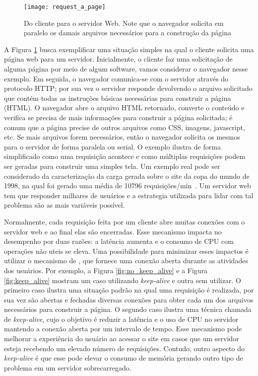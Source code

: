 \begin{figure}[!h]
  \centering
  \texttt{[image: request\_a\_page]}
  \caption{Do cliente para o servidor Web. Note que o navegador solicita em paralelo os damais arquivos necessários para a construção da página}
  \label{fig:client_to_web_server}
\end{figure}

A Figura \ref{fig:client_to_web_server} busca exemplificar uma situação simples
na qual o cliente solicita uma página web para um servidor. Inicialmente, o
cliente faz uma solicitação de alguma página por meio de algum software, vamos
considerar o navegador nesse exemplo. Em seguida, o navegador comunica-se com o
servidor através do protocolo HTTP; por sua vez o servidor responde devolvendo
o arquivo solicitado que contém todas as instruções básicas necessárias para
construir a página (HTML). O navegador abre o arquivo HTML retornado, converte
o conteúdo e verifica se precisa de mais informações para construir a página
solicitada; é comum que a página precise de outros arquivos como CSS, imagens,
javascript, etc. Se mais arquivos forem necessários, então o navegador solicita
os mesmos para o servidor de forma paralela ou serial. O exemplo ilustra de
forma simplificado como uma requisição acontece e como múltiplas requisições
podem ser geradas para construir uma simples tela. Um exemplo real pode ser
considerado da caracterização da carga gerada sobre o site da copa do mundo de
1998, na qual foi gerado uma média de 10796 requisições/min~\citep{worldcup}.
Um servidor web tem que responder milhares de usuários e a estrategia utilizada
para lidar com tal problema são as mais variáveis possível.

Normalmente, cada requisição feita por um cliente abre muitas conexões com o
servidor web e ao final elas são encerradas. Esse mecanismo impacta no
desempenho por duas razões: a latência aumenta e o consumo de CPU com operações
não uteis se eleva. Uma possibilidade para minimizar esses impactos é utilizar
o mecanismo de , que fornece uma conexão
aberta durante as atividades dos usuários. Por exemplo, a Figura
\ref{fig:no_keep_alive} e a Figura \ref{fig:keep_alive} mostram um caso
utilizando \textit{keep-alive} e outra sem utilizar. O primeiro caso ilustra
uma situação padrão na qual uma requisição é realizada, por sua vez são abertas
e fechadas diversas conexões para obter cada um dos arquivos necessários para
construir a página. O segundo caso ilustra uma técnica chamada de
\textit{keep-alive}, cujo o objetivo é reduzir a latência e o uso de CPU no
servidor mantendo a conexão aberta por um intervalo de tempo.  Esse mecanismo
pode melhorar a experiência do usuário ao acessar o site em casos que um
servidor esteja recebendo um elevado número de requisições. Contudo, outro
aspecto do \textit{keep-alive} é que esse pode elevar o consumo de memória
gerando outro tipo de problema em um servidor sobrecarregado.


